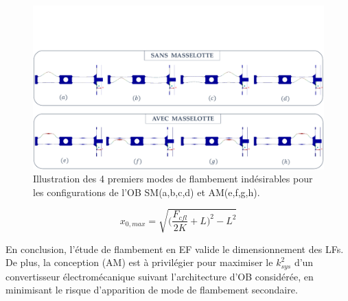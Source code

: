 \begin{figure}[!htbp]
\begin{center}
    \captionsetup{justification=centering}
	\includegraphics[trim={0cm 0cm 0cm 5cm},clip, width=\textwidth]{../Chap3/Figure/EF_flambement_avec_et_sans_masselotte.pdf}
	\caption{Illustration des 4 premiers modes de flambement indésirables pour les configurations de l'OB SM(a,b,c,d) et AM(e,f,g,h).}
	\label{fig:EF_flambement_avec_et_sans_masselotte}
\end{center}
\end{figure}
\begin{equation}
	x_{0,max} = \sqrt{\biggl(\dfrac{F_{cfl}}{2K} + L\biggr)^2 - L^2}
	\label{x0_max}
\end{equation}
\begin{table}[H]
	\centering
	\captionsetup{justification=centering}
	\caption{Niveau de flambement maximal à privilégier sur l'OB en fonction des conceptions des LFs}
	\label{tab:x0max}
\end{table}

En conclusion, l'étude de flambement en EF valide le dimensionnement des LFs. De plus, la conception (AM) est à privilégier pour maximiser le $k_{sys}^2$ d'un convertisseur électromécanique suivant l'architecture d'OB considérée, en minimisant le risque d'apparition de mode de flambement secondaire.  
